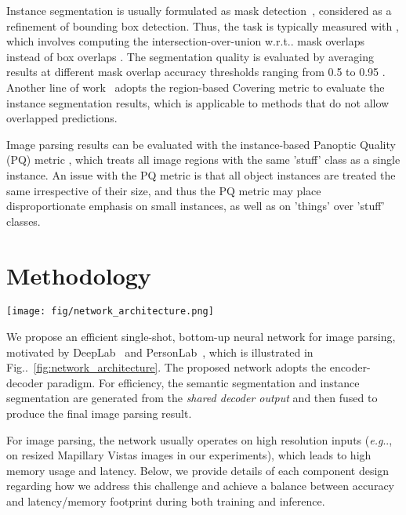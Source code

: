 \documentclass[10pt,twocolumn,letterpaper]{article}
\makeatletter
\def\@onedot{\ifx\@let@token.\else.\null\fi\xspace}
\DeclareRobustCommand\onedot{\futurelet\@let@token\@onedot}
\newcommand{\figref}[1]{Fig\onedot~\ref{#1}}
\def\eg{\emph{e.g}\onedot} \def\Eg{\emph{E.g}\onedot}
\def\wrt{w.r.t\onedot} \def\dof{d.o.f\onedot}
\makeatother
\begin{document}
Instance segmentation is usually formulated as mask detection~\cite{dai2016instance,dai2017fully,he2017mask}, considered as a refinement of bounding box detection. Thus, the task is typically measured with , which involves computing the intersection-over-union \wrt mask overlaps instead of box overlaps \cite{hariharan2014simultaneous}. The segmentation quality is evaluated by averaging  results at different mask overlap accuracy thresholds ranging from 0.5 to 0.95 \cite{lin2014microsoft,Cordts2016Cityscapes}. Another line of work~\cite{silberman2014instance,zhang2015monocular,zhang2016instance,ren2017end,liu2017sgn} adopts the region-based Covering metric to evaluate the instance segmentation results, which is applicable to methods that do not allow overlapped predictions.

Image parsing results can be evaluated with the instance-based Panoptic Quality (PQ) metric \cite{kirillov2018panoptic}, which treats all image regions with the same 'stuff' class as a single instance. An issue with the PQ metric is that all object instances are treated the same irrespective of their size, and thus the PQ metric may place disproportionate emphasis on small instances, as well as on 'things' over 'stuff' classes. 
\section{Methodology}
\label{sec:methodology}

\begin{figure*}[!t]
    \centering
    \texttt{[image: fig/network\_architecture.png]}
    \caption{The proposed single-shot, bottom-up network architecture employs the encoder-decoder structure and produces per-pixel semantic and instance predictions. The number of channels of each feature map is specified in the figure.}
    \label{fig:network_architecture}
\end{figure*}

We propose an efficient single-shot, bottom-up neural network for image parsing, motivated by DeepLab~\cite{deeplabv3plus2018} and PersonLab~\cite{papandreou2018personlab}, which is illustrated in \figref{fig:network_architecture}. The proposed network adopts the encoder-decoder paradigm. For efficiency, the semantic segmentation and instance segmentation are generated from the \emph{shared decoder output} and then fused to produce the final image parsing result.

For image parsing, the network usually operates on high resolution inputs (\eg,  on resized Mapillary Vistas images in our experiments), which leads to high memory usage and latency. Below, we provide details of each component design regarding how we address this challenge and achieve a balance between accuracy and latency/memory footprint during both training and inference.
\end{document}
